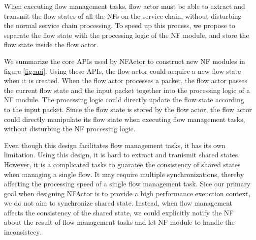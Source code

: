 When executing flow management tasks, flow actor must be able to extract and transmit the flow states of all the NFs on the service chain, without disturbing the normal service chain processing. To speed up this process, we propose to separate the flow state with the processing logic of the NF module, and store the flow state inside the flow actor.

We summarize the core APIs used by NFActor to construct new NF modules in figure \ref{fig:api}. Using these APIs, the flow actor could acquire a new flow state when it is created. When the flow actor processes a packet, the flow actor passes the current flow state and the input packet together into the processing logic of a NF module. The processing logic could directly update the flow state according to the input packet. Since the flow state is stored by the flow actor, the flow actor could directly manipulate its flow state when executing flow management tasks, without disturbing the NF processing logic.

Even though this design facilitates flow management tasks, it has its own limitation. Using this design, it is hard to extract and tranismit shared states. However, it is a complicated tasks to guaratee the consistency of shared states when managing a single flow. It may require multiple synchronizations, thereby affecting the processing speed of a single flow management task. Sice our primary goal when designing NFActor is to provide a high performance exeuction context, we do not aim to synchronize shared state. Instead, when flow management affects the consistency of the shared state, we could explicitly notify the NF about the result of flow management tasks and let NF module to handle the inconsistecy.

